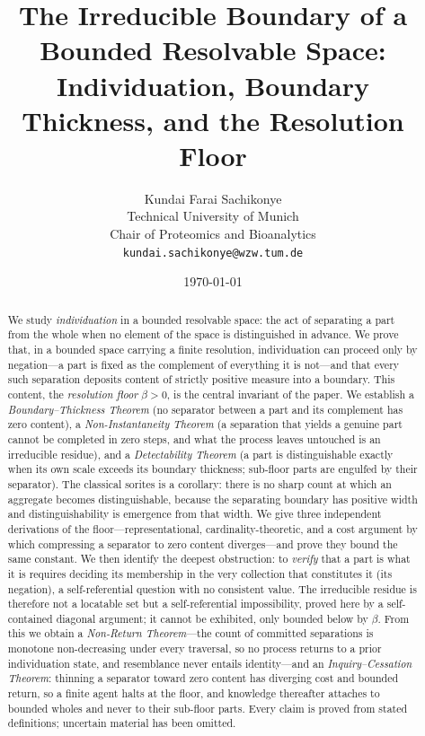 \documentclass[11pt,a4paper]{article}
\title{\textbf{The Irreducible Boundary of a Bounded Resolvable Space:\\[2pt]
Individuation, Boundary Thickness, and the Resolution Floor}}
\author{%
Kundai Farai Sachikonye\\
\small Technical University of Munich\\
\small Chair of Proteomics and Bioanalytics\\
\small \texttt{kundai.sachikonye@wzw.tum.de}}
\date{\today}
\theoremstyle{thmstyle}
\theoremstyle{definition}
\theoremstyle{remark}
\newcommand{\thick}{\beta}
\begin{document}
\maketitle

\begin{abstract}
\noindent
We study \emph{individuation} in a bounded resolvable space: the act of
separating a part from the whole when no element of the space is
distinguished in advance. We prove that, in a bounded space carrying a
finite resolution, individuation can proceed only by negation---a part is
fixed as the complement of everything it is not---and that every such
separation deposits content of strictly positive measure into a boundary.
This content, the \emph{resolution floor} $\thick>0$, is the central
invariant of the paper. We establish a \emph{Boundary--Thickness Theorem}
(no separator between a part and its complement has zero content), a
\emph{Non-Instantaneity Theorem} (a separation that yields a genuine part
cannot be completed in zero steps, and what the process leaves untouched is
an irreducible residue), and a \emph{Detectability Theorem} (a part is
distinguishable exactly when its own scale exceeds its boundary thickness;
sub-floor parts are engulfed by their separator). The classical sorites is a
corollary: there is no sharp count at which an aggregate becomes
distinguishable, because the separating boundary has positive width and
distinguishability is emergence from that width. We give three independent
derivations of the floor---representational, cardinality-theoretic, and a
cost argument by which compressing a separator to zero content diverges---and
prove they bound the same constant. We then identify the deepest obstruction:
to \emph{verify} that a part is what it is requires deciding its membership
in the very collection that constitutes it (its negation), a self-referential
question with no consistent value. The irreducible residue is therefore not a
locatable set but a self-referential impossibility, proved here by a
self-contained diagonal argument; it cannot be exhibited, only bounded below
by $\thick$. From this we obtain a \emph{Non-Return Theorem}---the count of
committed separations is monotone non-decreasing under every traversal, so no
process returns to a prior individuation state, and resemblance never entails
identity---and an \emph{Inquiry--Cessation Theorem}: thinning a separator
toward zero content has diverging cost and bounded return, so a finite agent
halts at the floor, and knowledge thereafter attaches to bounded wholes and
never to their sub-floor parts. Every claim is proved from stated definitions;
uncertain material has been omitted.
\end{abstract}
\end{document}
